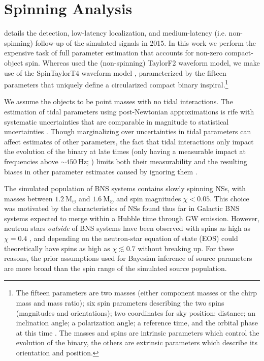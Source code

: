 \section{Spinning Analysis}
\label{sec:spin}

\citet{Singer_2014} details the detection, low-latency localization, and medium-latency (i.e. non-spinning) follow-up of the simulated signals in 2015. In this work we perform the expensive task of full parameter estimation that accounts for non-zero compact-object spin. Whereas \citet{Singer_2014} used the (non-spinning) TaylorF2 waveform model, we make use of the SpinTaylorT4 waveform model \citep{Buonanno_2003,Buonanno_2009}, parameterized by the fifteen parameters that uniquely define a circularized compact binary inspiral.\footnote{The fifteen parameters are two masses (either component masses or the chirp mass and mass ratio); six spin parameters describing the two spins (magnitudes and orientations); two coordinates for sky position; distance; an inclination angle; a polarization angle; a reference time, and the orbital phase at this time \citep[see][for more details]{Veitch_2015}. The masses and spins are intrinsic parameters which control the evolution of the binary, the others are extrinsic parameters which describe its orientation and position.}

We assume the objects to be point masses with no tidal interactions.  The estimation of tidal parameters using post-Newtonian approximations is rife with systematic uncertainties that are comparable in magnitude to statistical uncertainties \cite{Wade_2014}. Though marginalizing over uncertainties in tidal parameters can affect estimates of other parameters, the fact that tidal interactions only impact the evolution of the binary at late times (only having a measurable impact at frequencies above $\sim450~\mathrm{Hz}$; \citealt{Hinderer_2010}) limits both their measurability and the resulting biases in other parameter estimates caused by ignoring them \cite{Damour_2012}.

The simulated population of BNS systems contains slowly spinning NSs, with masses between $1.2~\mathrm{M}_\odot$ and $1.6~\mathrm{M}_\odot$ and spin magnitudes $\chi < 0.05$.  This choice was motivated by the characteristics of NSs found thus far in Galactic BNS systems expected to merge within a Hubble time through GW emission. However, neutron stars \emph{outside} of BNS systems have been observed with spins as high as $\chi = 0.4$ \citep{Hessels_2006,Brown_2012}, and depending on the neutron-star equation of state (EOS) could theoretically have spins as high as $\chi \lesssim 0.7$ \citep{Lo_2011} without breaking up.  For these reasons, the prior assumptions used for Bayesian inference of source parameters are more broad than the spin range of the simulated source population.

